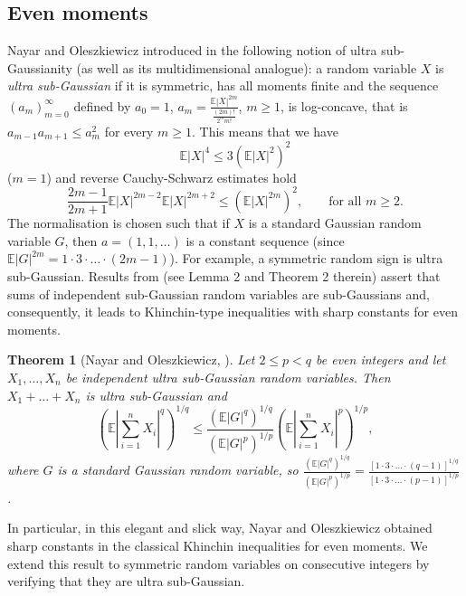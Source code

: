 \documentclass[10pt]{article}
\newcommand{\E}{\mathbb{E}}
\newcommand{\1}{\textbf{1}}
\newtheorem{theorem}{Theorem}
\theoremstyle{remark}
\theoremstyle{definition}
\begin{document}
\subsection{Even moments}



Nayar and Oleszkiewicz introduced in \cite{NO} the following notion of ultra sub-Gaussianity (as well as its multidimensional analogue): a random variable $X$ is \emph{ultra sub-Gaussian} if it is symmetric, has all moments finite and the sequence $(a_m)_{m=0}^\infty$ defined by $a_0 = 1$, $a_m = \frac{\E|X|^{2m}}{\frac{(2m)!}{2^mm!}}$, $m \geq 1$, is log-concave, that is $a_{m-1}a_{m+1} \leq a_{m}^2$ for every $m \geq 1$. This means that we have
\begin{equation}\label{eq:def-USG1}
\E|X|^4 \leq 3(\E|X|^2)^2
\end{equation}
($m=1$) and reverse Cauchy-Schwarz estimates hold
\begin{equation}\label{eq:def-USG2}
\frac{2m-1}{2m+1}\E|X|^{2m-2}\E|X|^{2m+2} \leq (\E|X|^{2m})^2, \qquad \text{for all $m \geq 2$}.
\end{equation}
The normalisation is chosen such that if $X$ is a standard Gaussian random variable $G$, then $a = (1,1,\dots)$ is a constant sequence (since $\E|G|^{2m} = 1\cdot 3\cdot\dots\cdot (2m-1)$). For example, a symmetric random sign is ultra sub-Gaussian. Results from \cite{NO} (see Lemma 2 and Theorem 2 therein) assert that sums of independent sub-Gaussian random variables are sub-Gaussians and, consequently, it leads to Khinchin-type inequalities with sharp constants for even moments.

\begin{theorem}[Nayar and Oleszkiewicz, \cite{NO}]\label{thm:NO}
Let $2 \leq p < q$ be even integers and let $X_1,\dots, X_n$ be independent ultra sub-Gaussian random variables. Then $X_1+\ldots+X_n$ is ultra sub-Gaussian and
\begin{equation}\label{eq:NO}
\left(\E\left|\sum_{i=1}^n X_i\right|^q\right)^{1/q} \leq \frac{(\E|G|^q)^{1/q}}{(\E|G|^p)^{1/p}}\left(\E\left|\sum_{i=1}^n X_i\right|^p\right)^{1/p},
\end{equation}
where $G$ is a standard Gaussian random variable, so $\frac{(\E|G|^q)^{1/q}}{(\E|G|^p)^{1/p}} = \frac{[1\cdot 3\cdot\ldots \cdot (q-1)]^{1/q}}{[1\cdot 3\cdot\ldots \cdot (p-1)]^{1/p}}$.
\end{theorem}

In particular, in this elegant and slick way, Nayar and Oleszkiewicz obtained sharp constants in the classical Khinchin inequalities for even moments. We extend this result to symmetric random variables on consecutive integers by verifying that they are ultra sub-Gaussian. 
\end{document}
